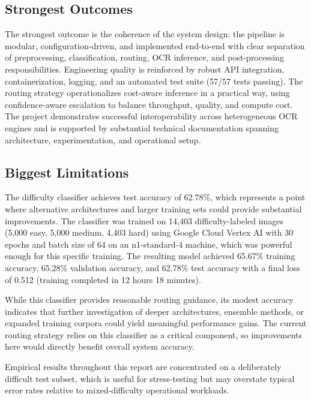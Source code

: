 \documentclass[12pt,a4paper]{article}
\begin{document}
\subsection{Strongest Outcomes}

The strongest outcome is the coherence of the system design: the
pipeline is modular, configuration-driven, and implemented
end-to-end with clear separation of preprocessing, classification,
routing, OCR inference, and post-processing responsibilities.
Engineering quality is reinforced by robust API integration,
containerization, logging, and an automated test suite (57/57 tests
passing). The routing strategy operationalizes cost-aware inference in
a practical way, using confidence-aware escalation to balance
throughput, quality, and compute cost. The project demonstrates
successful interoperability across heterogeneous OCR engines and is
supported by substantial technical documentation spanning
architecture, experimentation, and operational setup.

\subsection{Biggest Limitations}

The difficulty classifier achieves test accuracy of 62.78\%, which 
represents a point where alternative architectures and larger training 
sets could provide substantial improvements. The classifier was trained 
on 14,403 difficulty-labeled images (5,000 easy, 5,000 medium, 4,403 
hard) using Google Cloud Vertex AI with 30 epochs and batch size of 64 on 
an n1-standard-4 machine, which was powerful enough for this specific training. The resulting model achieved 65.67\% training 
accuracy, 65.28\% validation accuracy, and 62.78\% test accuracy with 
a final loss of 0.512 (training completed in 12 hours 18 minutes).

While this classifier provides reasonable routing guidance, its modest 
accuracy indicates that further investigation of deeper architectures, 
ensemble methods, or expanded training corpora could yield meaningful 
performance gains. The current routing strategy relies on this classifier 
as a critical component, so improvements here would directly benefit 
overall system accuracy.

Empirical results throughout this report are concentrated on a 
deliberately difficult test subset, which is useful for stress-testing 
but may overstate typical error rates relative to mixed-difficulty 
operational workloads.
\end{document}
